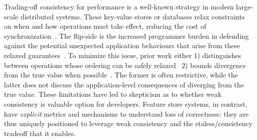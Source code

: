 

 Trading-off consistency for performance is a well-known strategy in modern large-scale distributed systems. These key-value stores or databases relax constraints on when and how operations must take effect, reducing the cost of synchronization~\cite{cooper2008pnuts,lloyd2011cops,sivasubramanian2012amazon, lloyd2011cops,bailis2012pbs,terry2013pileus,yu2022conit,cui2014bounded}. The flip-side is the increased programmer burden in defending against the potential unexpected application behaviours that arise from these relaxed guarantees~\cite{crooks2016tardis, bailis2012pbs}. To minimize this issue, prior work either 1) distinguishes between operations whose ordering can be safely relaxed~\cite{li2012redblue, kraska2013mdcc, bailis20iva} 2) bounds divergence from the true value when possible~\cite{yu2022conit,holt2016disciplined, wu1992divergence, cui2014bounded, wong1992bounded}. The former is often restrictive, while the latter does not discuss the application-level consequences of diverging from the true value. These limitations have led to skepticism as to whether weak consistency is valuable option for developers. Feature store systems, in contrast, have \textit{explicit} metrics and mechanisms to understand loss of correctness; they are thus uniquely positioned to leverage weak consistency and the staless/consistency tradeoff that it enables. 

%


